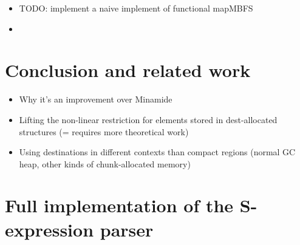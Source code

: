 \documentclass[english]{jflart}
\begin{document}
\begin{itemize}
\item TODO: implement a naive implement of functional mapMBFS
\item \end{itemize}

\section{Conclusion and related work}
\begin{itemize}
\item Why it's an improvement over Minamide

\item Lifting the non-linear restriction for elements stored in dest-allocated structures (= requires more theoretical work)

\item Using destinations in different contexts than compact regions (normal GC heap, other kinds of chunk-allocated memory)
\end{itemize}

\appendix

\section{Full implementation of the S-expression parser}\label{ann:parse-s-expr}
\end{document}
